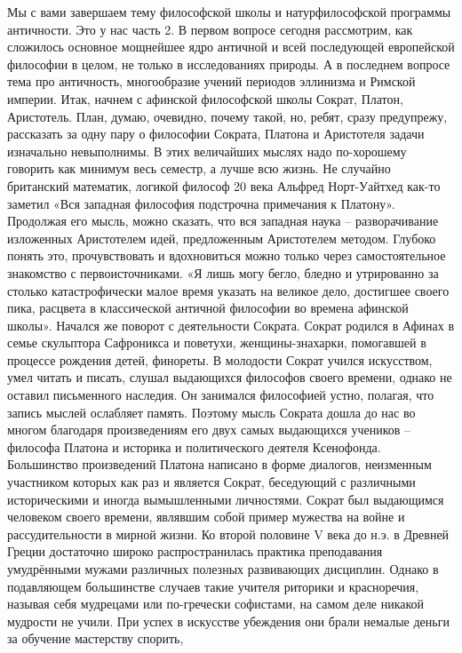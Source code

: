  Мы с вами завершаем тему философской школы и натурфилософской программы
античности. Это у нас часть 2. В первом вопросе сегодня рассмотрим, как
сложилось основное мощнейшее ядро античной и всей последующей европейской
философии в целом, не только в исследованиях природы. А в последнем вопросе тема
про античность, многообразие учений периодов эллинизма и Римской империи. Итак,
начнем с афинской философской школы Сократ, Платон, Аристотель. План, думаю,
очевидно, почему такой, но, ребят, сразу предупрежу, рассказать за одну пару о
философии Сократа, Платона и Аристотеля задачи изначально невыполнимы. В этих
величайших мыслях надо по-хорошему говорить как минимум весь семестр, а лучше
всю жизнь. Не случайно британский математик, логикой философ 20 века Альфред
Норт-Уайтхед как-то заметил «Вся западная философия подстрочна примечания к
Платону». Продолжая его мысль, можно сказать, что вся западная наука –
разворачивание изложенных Аристотелем идей, предложенным Аристотелем методом.
Глубоко понять это, прочувствовать и вдохновиться можно только через
самостоятельное знакомство с первоисточниками. «Я лишь могу бегло, бледно и
утрированно за столько катастрофически малое время указать на великое дело,
достигшее своего пика, расцвета в классической античной философии во времена
афинской школы». Начался же поворот с деятельности Сократа. Сократ родился в
Афинах в семье скульптора Сафроникса и поветухи, женщины-знахарки, помогавшей в
процессе рождения детей, финореты. В молодости Сократ учился искусством, умел
читать и писать, слушал выдающихся философов своего времени, однако не оставил
письменного наследия. Он занимался философией устно, полагая, что запись мыслей
ослабляет память. Поэтому мысль Сократа дошла до нас во многом благодаря
произведениям его двух самых выдающихся учеников – философа Платона и историка и
политического деятеля Ксенофонда. Большинство произведений Платона написано в
форме диалогов, неизменным участником которых как раз и является Сократ,
беседующий с различными историческими и иногда вымышленными личностями. Сократ
был выдающимся человеком своего времени, являвшим собой пример мужества на войне
и рассудительности в мирной жизни. Ко второй половине V века до н.э. в Древней
Греции достаточно широко распространилась практика преподавания умудрёнными
мужами различных полезных развивающих дисциплин. Однако в подавляющем
большинстве случаев такие учителя риторики и красноречия, называя себя мудрецами
или по-гречески софистами, на самом деле никакой мудрости не учили. При успех в
искусстве убеждения они брали немалые деньги за обучение мастерству спорить,
